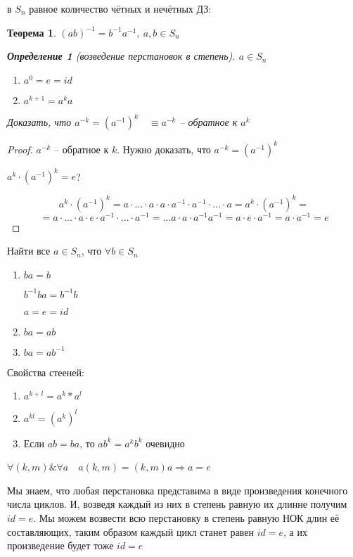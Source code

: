 \documentclass[11pt,a4paper]{book}
\newtheorem{Def}{Определение}[chapter]
\newtheorem{Th}{Теорема}[chapter]
\begin{document}
в $S_n$ равное количество чётных и нечётных
ДЗ:
\begin{Th}
	$(ab)^{-1}= b^{-1}a^{-1},~a, b \in S_n$
	\begin{Def}[возведение перстановок в степень]
		$a \in S_n$
		\begin{enumerate}
			\item $a^0 = e = id$
			\item $a^{k+1} = a^ka$
		\end{enumerate}
	\end{Def}
	
	Доказать, что $a^{-k} = (a^{-1})^{k} \quad \equiv a^{-k}$ -- обратное к $a^k$
\end{Th}

\begin{proof}
	$a^{-k}$ -- обратное к $k$. Нужно доказать, что $a^{-k}=(a^{-1})^k$
	
	$a^k\cdot(a^{-1})^k=e$?
	
	$$a^k \cdot (a^{-1})^k= a \cdot \hdots\cdot a\cdot a\cdot a^{-1}\cdot a^{-1}\cdot\hdots\cdot a=a^k\cdot(a^{-1})^k=$$
	$$= a\cdot\hdots\cdot a\cdot e\cdot a^{-1}\cdot\hdots\cdot a^{-1}=\hdots a\cdot a\cdot a^{-1}a^{-1}=a\cdot e\cdot a^{-1}=a\cdot a^{-1}=e$$
\end{proof}


Найти все $a \in S_n$, что $\forall b \in S_n$
\begin{enumerate}
	\item $ba=b$
	
	$b^{-1}ba = b^{-1}b$
	
	$a=e=id$
	\item $ba = ab$
	\item $ba = ab^{-1}$
\end{enumerate}



Свойства стееней:
\begin{enumerate}
	\item $a^{k+l}=a^k*a^l$
	\item $a^{kl}=(a^k)^l$
	\item Если $ab = ba$, то $ab^k = a^kb^k$ очевидно
\end{enumerate}

$\forall (k, m) \& \forall a \quad a(k, m)=(k, m)a\Rightarrow a = e$\

Мы знаем, что любая перстановка представима в виде произведения конечного числа циклов. И, возведя каждый из них в степень равную их длинне получим $id=e$. Мы можем возвести всю перстановку в степень равную НОК длин её составляющих, таким образом каждый цикл станет равен $id=e$, а их произведение будет тоже $id=e$
\end{document}
